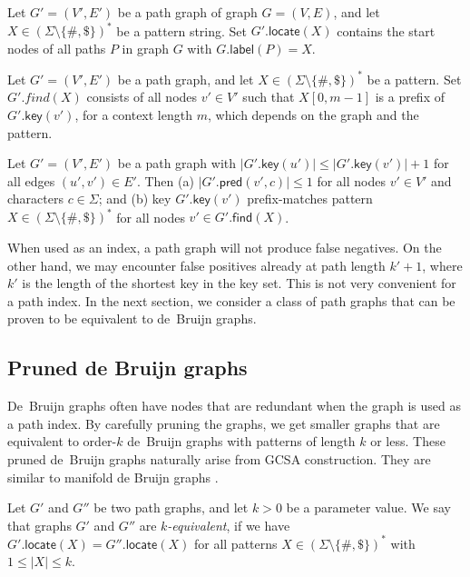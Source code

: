\documentclass[a4paper,UKenglish]{lipics-v2016}
\newcommand{\set}[1]{\ensuremath{\{ #1 \}}}
\newcommand{\abs}[1]{\ensuremath{\lvert #1 \rvert}}
\newcommand{\find}{\ensuremath{\mathsf{find}}}
\newcommand{\locate}{\ensuremath{\mathsf{locate}}}
\newcommand{\glabel}{\ensuremath{\mathsf{label}}}
\newcommand{\gpred}{\ensuremath{\mathsf{pred}}}
\newcommand{\gkey}{\ensuremath{\mathsf{key}}}
\newcommand{\kequivalent}[1]{$#1$\nobreakdash-equivalent}
\newcommand{\orderk}[1]{order\nobreakdash-$#1$}
\newcommand{\patternset}{\ensuremath{(\Sigma \setminus \set{\#, \$})^{\ast}}}
\begin{document}
\begin{lemma}\label{lemma:pg-fn}
Let $G' = (V', E')$ be a path graph of graph $G = (V, E)$, and let $X \in \patternset$ be a pattern string. Set $G'.\locate(X)$ contains the start nodes of all paths $P$ in graph $G$ with $G.\glabel(P) = X$.
\end{lemma}

\begin{lemma}\label{lemma:pg-context}
Let $G' = (V', E')$ be a path graph, and let $X \in \patternset$ be a pattern. Set $G'.find(X)$ consists of all nodes $v' \in V'$ such that $X[0, m-1]$ is a prefix of $G'.\gkey(v')$, for a context length $m$, which depends on the graph and the pattern.
\end{lemma}

\begin{lemma}\label{lemma:pg-keys}
Let $G' = (V', E')$ be a path graph with $\abs{G'.\gkey(u')} \le \abs{G'.\gkey(v')}+1$ for all edges $(u', v') \in E'$. Then
(a) $\abs{G'.\gpred(v', c)} \le 1$ for all nodes $v' \in V'$ and characters $c \in \Sigma$; and
(b) key $G'.\gkey(v')$ prefix-matches pattern $X \in \patternset$ for all nodes $v' \in G'.\find(X)$.
\end{lemma}

When used as an index, a path graph will not produce false negatives. On the other hand, we may encounter false positives already at path length $k'+1$, where $k'$ is the length of the shortest key in the key set. This is not very convenient for a path index. In the next section, we consider a class of path graphs that can be proven to be equivalent to de~Bruijn graphs.

\subsection{Pruned de Bruijn graphs}

De~Bruijn graphs often have nodes that are redundant when the graph is used as a path index. By carefully pruning the graphs, we get smaller graphs that are equivalent to \orderk{k} de~Bruijn graphs with patterns of length $k$ or less. These pruned de~Bruijn graphs naturally arise from GCSA construction. They are similar to manifold de Bruijn graphs \cite{Lin2014}.

\begin{definition}
Let $G'$ and $G''$ be two path graphs, and let $k > 0$ be a parameter value. We say that graphs $G'$ and $G''$ are \emph{\kequivalent{k}}, if we have $G'.\locate(X) = G''.\locate(X)$ for all patterns $X \in \patternset$ with $1 \le \abs{X} \le k$.
\end{definition}
\end{document}
